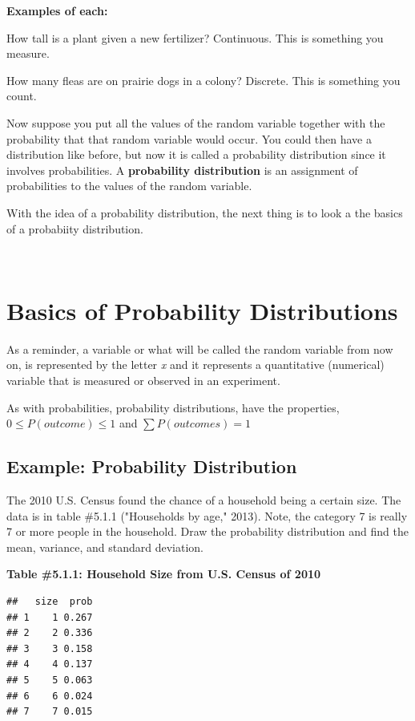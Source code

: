 \documentclass[]{book}
\begin{document}
\textbf{Examples of each:}

How tall is a plant given a new fertilizer? Continuous. This is something you measure.

How many fleas are on prairie dogs in a colony? Discrete. This is something you count.

Now suppose you put all the values of the random variable together with the probability that that random variable would occur. You could then have a distribution like before, but now it is called a probability distribution since it involves probabilities. A \textbf{probability distribution} is an assignment of probabilities to the values of the random variable.

With the idea of a probability distribution, the next thing is to look a the basics of a probabiity distribution.

\emph{\\
}

\hypertarget{basics-of-probability-distributions}{%
\section{Basics of Probability Distributions}\label{basics-of-probability-distributions}}

As a reminder, a variable or what will be called the random variable from now on, is represented by the letter \emph{x} and it represents a quantitative (numerical) variable that is measured or observed in an experiment.

As with probabilities, probability distributions, have the properties, \(0 \le P(outcome)\le1\) and \(\sum{P(outcomes)}=1\)

\hypertarget{example-probability-distribution}{%
\subsection{Example: Probability Distribution}\label{example-probability-distribution}}

The 2010 U.S. Census found the chance of a household being a certain
size. The data is in table \#5.1.1 ("Households by age," 2013). Note, the category 7 is really 7 or more people in the household. Draw the probability distribution and find the mean, variance, and standard deviation.

\textbf{Table \#5.1.1: Household Size from U.S. Census of 2010}

\begin{verbatim}
##   size  prob
## 1    1 0.267
## 2    2 0.336
## 3    3 0.158
## 4    4 0.137
## 5    5 0.063
## 6    6 0.024
## 7    7 0.015
\end{verbatim}
\end{document}
